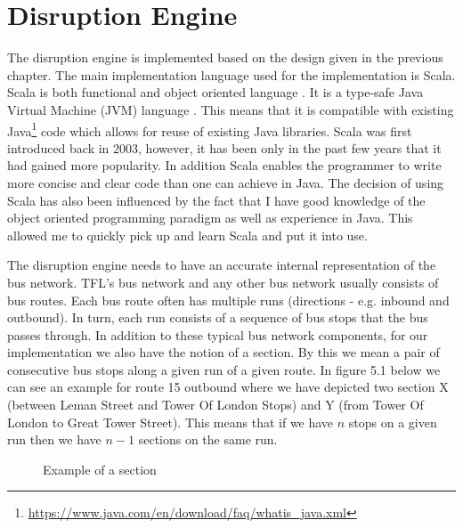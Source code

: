 \section{Disruption Engine}
The disruption engine is implemented based on the design given in the previous chapter. The main implementation language used for the implementation is Scala. Scala is both functional and object oriented language \cite{odersky2008programming}. It is a type-safe Java Virtual Machine (JVM) language \cite{odersky2008programming}. This means that it is compatible with existing Java\footnote{\url{https://www.java.com/en/download/faq/whatis_java.xml}} code which allows for reuse of existing Java libraries. Scala was first introduced back in 2003, however, it has been only in the past few years that it had gained more popularity. In addition Scala enables the programmer to write more concise and clear code than one can achieve in Java. The decision of using Scala has also been influenced by the fact that I have good knowledge of the object oriented programming paradigm as well as experience in Java. This allowed me to quickly pick up and learn Scala and put it into use.

The disruption engine needs to have an accurate internal representation of the bus network. TFL's bus network and any other bus network usually consists of bus routes. Each bus route often has multiple runs (directions - e.g. inbound and outbound). In turn, each run consists of a sequence of bus stops that the bus passes through. In addition to these typical bus network components, for our implementation we also have the notion of a section. By this we mean a pair of consecutive bus stops along a given run of a given route. In figure 5.1 below we can see an example for route 15 outbound where we have depicted two section X (between Leman Street and Tower Of London Stops) and Y (from Tower Of London to Great Tower Street). This means that if we have $n$ stops on a given run then we have $n-1$ sections on the same run.

\begin{figure}[ht]
	\caption{Example of a section}
	\label{fig:sectionExample}
\end{figure}

